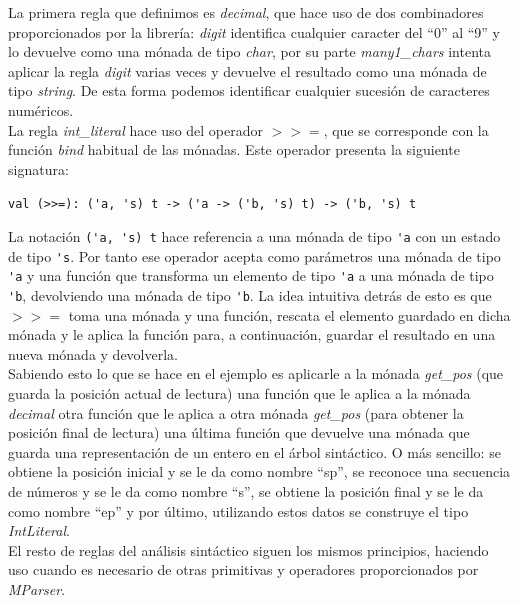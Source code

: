 La primera regla que definimos es \textit{decimal}, que hace uso de dos combinadores proporcionados por la librería: \textit{digit} identifica cualquier caracter del ``0'' al ``9'' y lo devuelve como una mónada de tipo \textit{char}, por su parte \textit{many1\_chars} intenta aplicar la regla \textit{digit} varias veces y devuelve el resultado como una mónada de tipo \textit{string}. De esta forma podemos identificar cualquier sucesión de caracteres numéricos.\\

La regla \textit{int\_literal} hace uso del operador $>>=$, que se corresponde con la función \textit{bind} habitual de las mónadas. Este operador presenta la siguiente signatura:

\begin{center}
	\lstinline[style=ocaml]{val (>>=): ('a, 's) t -> ('a -> ('b, 's) t) -> ('b, 's) t}
\end{center}

La notación \lstinline[style=ocaml]{('a, 's) t} hace referencia a una mónada de tipo \lstinline[style=ocaml]{'a} con un estado de tipo \lstinline[style=ocaml]{'s}. Por tanto ese operador acepta como parámetros una mónada de tipo \lstinline[style=ocaml]{'a} y una función que transforma un elemento de tipo \lstinline[style=ocaml]{'a} a una mónada de tipo \lstinline[style=ocaml]{'b}, devolviendo una mónada de tipo \lstinline[style=ocaml]{'b}. La idea intuitiva detrás de esto es que $>>=$ toma una mónada y una función, rescata el elemento guardado en dicha mónada y le aplica la función para, a continuación, guardar el resultado en una nueva mónada y devolverla.\\

Sabiendo esto lo que se hace en el ejemplo es aplicarle a la mónada \textit{get\_pos} (que guarda la posición actual de lectura) una función que le aplica a la mónada \textit{decimal} otra función que le aplica a otra mónada \textit{get\_pos} (para obtener la posición final de lectura) una última función que devuelve una mónada que guarda una representación de un entero en el árbol sintáctico. O más sencillo: se obtiene la posición inicial y se le da como nombre ``sp'', se reconoce una secuencia de números y se le da como nombre ``s'', se obtiene la posición final y se le da como nombre ``ep'' y por último, utilizando estos datos se construye el tipo \textit{IntLiteral}.\\

El resto de reglas del análisis sintáctico siguen los mismos principios, haciendo uso cuando es necesario de otras primitivas y operadores proporcionados por \textit{MParser}.\\


